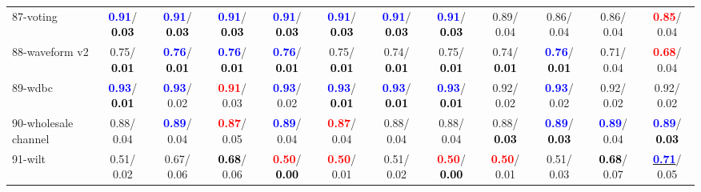 \begin{table}[h]
\begin{center}
{\begin{tabular}{lc|c|c|c|c|c|c|c|c|c|c}
87-voting & \textcolor{blue}{\textbf{  0.91}}/\textcolor{black}{\textbf{  0.03}} & \textcolor{blue}{\textbf{  0.91}}/\textcolor{black}{\textbf{  0.03}} & \textcolor{blue}{\textbf{  0.91}}/\textcolor{black}{\textbf{  0.03}} & \textcolor{blue}{\textbf{  0.91}}/\textcolor{black}{\textbf{  0.03}} & \textcolor{blue}{\textbf{  0.91}}/\textcolor{black}{\textbf{  0.03}} & \textcolor{blue}{\textbf{  0.91}}/\textcolor{black}{\textbf{  0.03}} & \textcolor{blue}{\textbf{  0.91}}/\textcolor{black}{\textbf{  0.03}} &   0.89/  0.04 &   0.86/  0.04 &   0.86/  0.04 & \textcolor{red}{\textbf{  0.85}}/  0.04 \\
88-waveform v2 &   0.75/\textcolor{black}{\textbf{  0.01}} & \textcolor{blue}{\textbf{  0.76}}/\textcolor{black}{\textbf{  0.01}} & \textcolor{blue}{\textbf{  0.76}}/\textcolor{black}{\textbf{  0.01}} & \textcolor{blue}{\textbf{  0.76}}/\textcolor{black}{\textbf{  0.01}} &   0.75/\textcolor{black}{\textbf{  0.01}} &   0.74/\textcolor{black}{\textbf{  0.01}} &   0.75/\textcolor{black}{\textbf{  0.01}} &   0.74/\textcolor{black}{\textbf{  0.01}} & \textcolor{blue}{\textbf{  0.76}}/\textcolor{black}{\textbf{  0.01}} &   0.71/  0.04 & \textcolor{red}{\textbf{  0.68}}/  0.04 \\
89-wdbc & \textcolor{blue}{\textbf{  0.93}}/\textcolor{black}{\textbf{  0.01}} & \textcolor{blue}{\textbf{  0.93}}/  0.02 & \textcolor{red}{\textbf{  0.91}}/  0.03 & \textcolor{blue}{\textbf{  0.93}}/  0.02 & \textcolor{blue}{\textbf{  0.93}}/\textcolor{black}{\textbf{  0.01}} & \textcolor{blue}{\textbf{  0.93}}/\textcolor{black}{\textbf{  0.01}} & \textcolor{blue}{\textbf{  0.93}}/\textcolor{black}{\textbf{  0.01}} &   0.92/  0.02 & \textcolor{blue}{\textbf{  0.93}}/  0.02 &   0.92/  0.02 &   0.92/  0.02 \\
90-wholesale channel &   0.88/  0.04 & \textcolor{blue}{\textbf{  0.89}}/  0.04 & \textcolor{red}{\textbf{  0.87}}/  0.05 & \textcolor{blue}{\textbf{  0.89}}/  0.04 & \textcolor{red}{\textbf{  0.87}}/  0.04 &   0.88/  0.04 &   0.88/  0.04 &   0.88/\textcolor{black}{\textbf{  0.03}} & \textcolor{blue}{\textbf{  0.89}}/\textcolor{black}{\textbf{  0.03}} & \textcolor{blue}{\textbf{  0.89}}/  0.04 & \textcolor{blue}{\textbf{  0.89}}/\textcolor{black}{\textbf{  0.03}} \\
91-wilt &   0.51/  0.02 &   0.67/  0.06 & \textcolor{black}{\textbf{  0.68}}/  0.06 & \textcolor{red}{\textbf{  0.50}}/\textcolor{black}{\textbf{  0.00}} & \textcolor{red}{\textbf{  0.50}}/  0.01 &   0.51/  0.02 & \textcolor{red}{\textbf{  0.50}}/\textcolor{black}{\textbf{  0.00}} & \textcolor{red}{\textbf{  0.50}}/  0.01 &   0.51/  0.03 & \textcolor{black}{\textbf{  0.68}}/  0.07 & \underline{\textcolor{blue}{\textbf{  0.71}}}/  0.05 \\

\end{tabular}}
\end{center}
\end{table}
